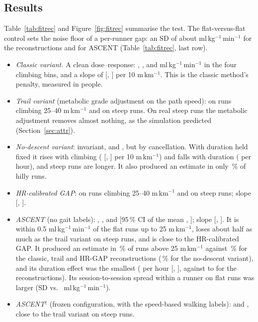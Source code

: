 \documentclass[11pt,a4paper]{article}
\newcommand{\unit}{ml\,kg$^{-1}$\,min$^{-1}$}
\newcommand{\ascent}{ASCENT}
\begin{document}
\subsection{Results}
Table~\ref{tab:fitrec} and Figure~\ref{fig:fitrec} summarise the test. The flat-versus-flat control sets the noise floor of a per-runner gap: an SD of about \nfrNoiseSdGflat{} \unit{} for the reconstructions and \nfrNoiseSdASCENT{} for \ascent{} (Table~\ref{tab:fitrec}, last row).
\begin{itemize}[leftmargin=*]
\item \emph{Classic variant.} A clean dose--response: \nfrTrimAGflat, \nfrTrimBGflat, \nfrTrimCGflat{} and \nfrTrimDGflat{} \unit{} in the four climbing bins, and a slope of \nfrSlopeGflat{} [\nfrSlopeLoGflat, \nfrSlopeHiGflat] per 10 m\,km$^{-1}$. This is the classic method's penalty, measured in \nnFitrecRunners{} people.
\item \emph{Trail variant} (metabolic grade adjustment on the path speed): \nfrTrimCGtrail{} on runs climbing 25--40 m\,km$^{-1}$ and \nfrTrimDGtrail{} on steep runs. On real steep runs the metabolic adjustment removes almost nothing, as the simulation predicted (Section~\ref{sec:attr}).
\item \emph{No-descent variant}: invariant, \nfrTrimCGnodesc{} and \nfrTrimDGnodesc, but by cancellation. With duration held fixed it rises with climbing (\nfrSlopeGnodesc{} [\nfrSlopeLoGnodesc, \nfrSlopeHiGnodesc] per 10 m\,km$^{-1}$) and falls with duration (\nfrPerHourGnodesc{} per hour), and steep runs are longer. It also produced an estimate in only \nfrCovHillyGnodesc\,\% of hilly runs.
\item \emph{HR-calibrated GAP}: \nfrTrimCGhrgap{} on runs climbing 25--40 m\,km$^{-1}$ and \nfrTrimDGhrgap{} on steep runs; slope \nfrSlopeGhrgap{} [\nfrSlopeLoGhrgap, \nfrSlopeHiGhrgap].
\item \emph{\ascent{}} (no gait labels): \nfrTrimAASCENT, \nfrTrimBASCENT, \nfrTrimCASCENT{} and \nfrTrimDASCENT{} [95\,\% CI of the mean \nfrLoDASCENT, \nfrHiDASCENT]; slope \nfrSlopeASCENT{} [\nfrSlopeLoASCENT, \nfrSlopeHiASCENT]. It is within 0.5 \unit{} of the flat runs up to 25 m\,km$^{-1}$, loses about half as much as the trail variant on steep runs, and is close to the HR-calibrated GAP. It produced an estimate in \nfrCovHillyASCENT\,\% of runs above 25 m\,km$^{-1}$ against \nfrCovHillyGhrgap\,\% for the classic, trail and HR-GAP reconstructions (\nfrCovHillyGnodesc\,\% for the no-descent variant), and its duration effect was the smallest (\nfrPerHourASCENT{} per hour [\nfrPerHourLoASCENT, \nfrPerHourHiASCENT], against \nfrPerHourGflat{} to \nfrPerHourGnodesc{} for the reconstructions). Its session-to-session spread within a runner on flat runs was larger (SD \nfrSessSdASCENT{} vs.\ \nfrSessSdGhrgap{} \unit).
\item \emph{\ascent$^{\dagger}$} (frozen configuration, with the speed-based walking labels): \nfrTrimCASCENTgh{} and \nfrTrimDASCENTgh, close to the trail variant on steep runs.
\end{itemize}
\end{document}
